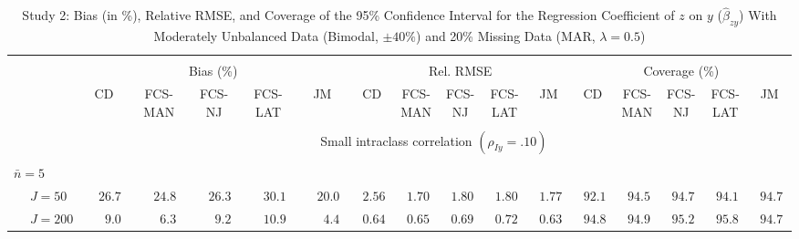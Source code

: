 \begin{sidewaystable}
\begin{threeparttable}
\setlength{\tabcolsep}{1.0pt}
\renewcommand{\arraystretch}{0.95}
\footnotesize
\caption{\small Study 2: Bias (in \%), Relative RMSE, and Coverage of the 95\% Confidence Interval for the Regression Coefficient of $z$ on $y$ ($\hat\beta_{zy}$) With Moderately Unbalanced Data (Bimodal, $\pm 40\%$) and 20\% Missing Data (MAR, $\lambda=0.5$)}
\begin{tabular}{llccccccccccccccc}
\hline\\[-1.8ex]
& & \multicolumn{5}{c}{Bias (\%)} & \multicolumn{5}{c}{Rel. RMSE} & \multicolumn{5}{c}{Coverage (\%)} \\ \cmidrule(r){3-7}\cmidrule(r){8-12}\cmidrule(r){13-17}
 &  & CD & \makecell{FCS-\\MAN} & \makecell{FCS-\\NJ} & \makecell{FCS-\\LAT} & JM & CD & \makecell{FCS-\\MAN} & \makecell{FCS-\\NJ} & \makecell{FCS-\\LAT} & JM & CD & \makecell{FCS-\\MAN} & \makecell{FCS-\\NJ} & \makecell{FCS-\\LAT} & \multicolumn{1}{c}{JM} \\ 
[0.4ex]\hline\\[-1.8ex]
& & \multicolumn{15}{c}{Small intraclass correlation $(\rho_{Iy}=.10)$} \\[0.6ex]\hline\\[-1.8ex]
\multicolumn{4}{l}{$\bar{n}=5$} \\  & \nopagebreak $\;J=50$  & $\phantom{-}26.7\phantom{0}$ & $\phantom{-}24.8\phantom{0}$ & $\phantom{-}26.3\phantom{0}$ & $\phantom{-}30.1\phantom{0}$ & $\phantom{-}20.0\phantom{0}$ & $\phantom{0}2.56\phantom{0}$ & $\phantom{0}1.70\phantom{0}$ & $\phantom{0}1.80\phantom{0}$ & $\phantom{0}1.80\phantom{0}$ & $\phantom{0}1.77\phantom{0}$ & $\phantom{0}92.1\phantom{0}$ & $\phantom{0}94.5\phantom{0}$ & $\phantom{0}94.7\phantom{0}$ & $\phantom{0}94.1\phantom{0}$ & $\phantom{0}94.7\phantom{0}$ \\
 & \nopagebreak $\;J=200$  & $\phantom{0}\phantom{-}9.0\phantom{0}$ & $\phantom{0}\phantom{-}6.3\phantom{0}$ & $\phantom{0}\phantom{-}9.2\phantom{0}$ & $\phantom{-}10.9\phantom{0}$ & $\phantom{0}\phantom{-}4.4\phantom{0}$ & $\phantom{0}0.64\phantom{0}$ & $\phantom{0}0.65\phantom{0}$ & $\phantom{0}0.69\phantom{0}$ & $\phantom{0}0.72\phantom{0}$ & $\phantom{0}0.63\phantom{0}$ & $\phantom{0}94.8\phantom{0}$ & $\phantom{0}94.9\phantom{0}$ & $\phantom{0}95.2\phantom{0}$ & $\phantom{0}95.8\phantom{0}$ & $\phantom{0}94.7\phantom{0}$ \\

\end{tabular}
\end{threeparttable}
\end{sidewaystable}

